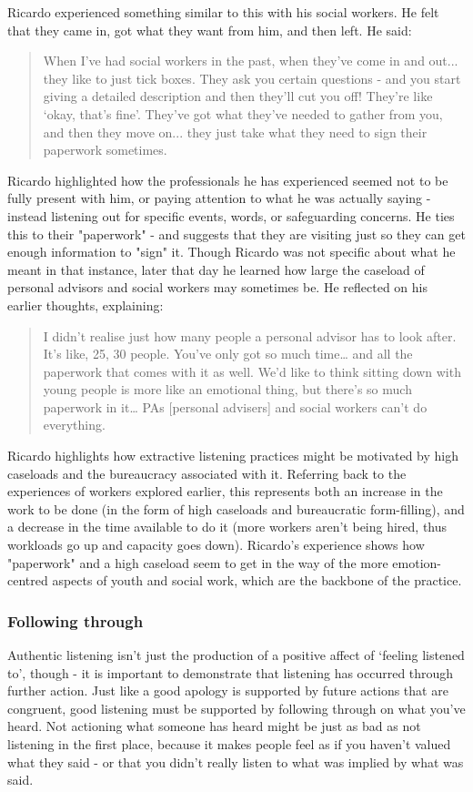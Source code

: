 Ricardo experienced something similar to this with his social workers. He felt that they came in, got what they want from him, and then left. He said:
\begin{quote}
When I've had social workers in the past, when they've come in and out... they like to just tick boxes. They ask you certain questions - and you start giving a detailed description and then they'll cut you off! They're like `okay, that's fine'. They've got what they've needed to gather from you, and then they move on... they just take what they need to sign their paperwork sometimes.
\end{quote}
Ricardo highlighted how the professionals he has experienced seemed not to be fully present with him, or paying attention to what he was actually saying - instead listening out for specific events, words, or safeguarding concerns. He ties this to their "paperwork" - and suggests that they are visiting just so they can get enough information to "sign" it. Though Ricardo was not specific about what he meant in that instance, later that day he learned how large the caseload of personal advisors and social workers may sometimes be. He reflected on his earlier thoughts, explaining:
\begin{quote}
I didn’t realise just how many people a personal advisor has to look after. It’s like, 25, 30 people. You’ve only got so much time… and all the paperwork that comes with it as well. We’d like to think sitting down with young people is more like an emotional thing, but there’s so much paperwork in it… PAs [personal advisers] and social workers can’t do everything.
\end{quote}
Ricardo highlights how extractive listening practices might be motivated by high caseloads and the bureaucracy associated with it. Referring back to the experiences of workers explored earlier, this represents both an increase in the work to be done (in the form of high caseloads and bureaucratic form-filling), and a decrease in the time available to do it (more workers aren’t being hired, thus workloads go up and capacity goes down). Ricardo's experience shows how "paperwork" and a high caseload seem to get in the way of the more emotion-centred aspects of youth and social work, which are the backbone of the practice. 

\subsubsection{Following through}
Authentic listening isn’t just the production of a positive affect of ‘feeling listened to’, though - it is important to demonstrate that listening has occurred through further action. Just like a good apology is supported by future actions that are congruent, good listening must be supported by following through on what you’ve heard. Not actioning what someone has heard might be just as bad as not listening in the first place, because it makes people feel as if you haven't valued what they said - or that you didn't really listen to what was implied by what was said.

